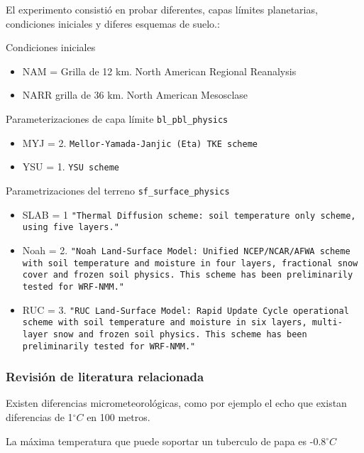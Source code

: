 \documentclass[11pt]{article}
\def\celc{$^{\circ}C$ }%
\begin{document}
El experimento consistió en probar diferentes, capas límites planetarias, condiciones iniciales y diferes esquemas de suelo.:

Condiciones iniciales
\begin{itemize}
\item NAM = Grilla de 12 km. North American Regional Reanalysis
\item NARR grilla de 36 km. North American Mesosclase
\end{itemize}

Parameterizaciones de capa límite \texttt{bl\_pbl\_physics}
\begin{itemize}
\item MYJ = 2. \texttt{Mellor-Yamada-Janjic (Eta) TKE scheme}
\item YSU = 1. \texttt{YSU scheme}
\end{itemize}

Parametrizaciones del terreno \texttt{sf\_surface\_physics}
\begin{itemize}

\item SLAB = 1 \texttt{"Thermal Diffusion scheme: soil temperature only scheme, using five layers."}

\item Noah = 2. \texttt{"Noah Land-Surface Model: Unified NCEP/NCAR/AFWA scheme with soil temperature and moisture in four layers, fractional snow cover and frozen soil physics. This scheme has been preliminarily tested for WRF-NMM."}


\item RUC = 3. \texttt{"RUC Land-Surface Model: Rapid Update Cycle operational scheme with soil temperature and moisture in six layers, multi-layer snow and frozen soil physics. This scheme has been preliminarily tested for WRF-NMM."}



\end{itemize}



\subsubsection{Revisión de literatura relacionada}


Existen diferencias micrometeorológicas, como por ejemplo el echo que existan diferencias de 1\celc en 100 metros.

La máxima temperatura que puede soportar un tuberculo de papa es -0.8\celc\\
\end{document}
